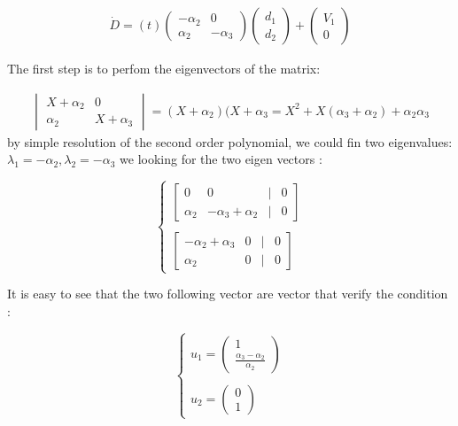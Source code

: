 \documentclass{article}
\begin{document}
	\begin{align*}
		\dot{D}=(t)\begin{pmatrix}
			-\alpha_2 & 0 \\
			\alpha_2 & -\alpha_3
		\end{pmatrix}
		\begin{pmatrix}
			d_1 \\
			d_2
		\end{pmatrix} + 
		\begin{pmatrix}
			V_1 \\
			0
		\end{pmatrix}
	\end{align*}
	
	The first step is to perfom the eigenvectors of the matrix:
	
	\begin{align*}
		\begin{vmatrix}
			X+\alpha_2 & 0 \\
			\alpha_2 & X+\alpha_3
		\end{vmatrix} = (X+\alpha_2)(X+\alpha_3=X^2+X(\alpha_3+\alpha_2)+\alpha_2\alpha_3
	\end{align*}
	by simple resolution of the second order polynomial, we could fin two eigenvalues: \newline
	$\lambda_1=-\alpha_2, \lambda_2 = -\alpha_3$
	we looking for the two eigen vectors : 
	
	\[
	\begin{cases}
		\begin{bmatrix}
			0 & 0 & | & 0 \\
			\alpha_2 & -\alpha_3 + \alpha_2 & | & 0
		\end{bmatrix} \\ \\
		\begin{bmatrix}
			-\alpha_2 + \alpha_3 & 0 & | & 0 \\
			\alpha_2 & 0 & | & 0
		\end{bmatrix}
	\end{cases}
	\]
	
	It is easy to see that the two following vector are vector that verify the condition : 
	
	\[
	\begin{cases}
		u_1=\begin{pmatrix}
			1 \\
			\frac{\alpha_3-\alpha_2}{\alpha_2}
		\end{pmatrix} \\ \\
		u_2=\begin{pmatrix}
			0 \\
			1
		\end{pmatrix}
	\end{cases}
	\]
	
\end{document}
